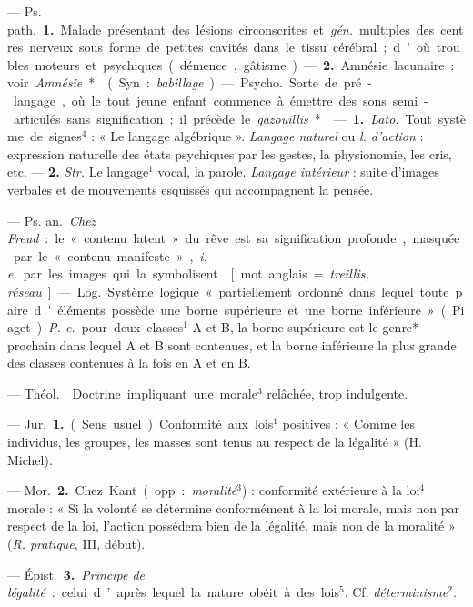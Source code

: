 
	\begin{itemize}[leftmargin=1cm, label=, itemsep=1pt]

 — \si{Ps. path.} {\bf 1.} Malade présentant des lésions
circonscrites et {\it gén.} multiples des centres nerveux sous forme de
petites cavités dans le tissu cérébral ; d’où troubles moteurs et psychiques
(démence, gâtisme). — {\bf 2.} Amnésie lacunaire : voir {\it Amnésie}*.

 (Syn. : {\it babillage}). — \si{Psycho.} Sorte de pré-langage,
où le tout jeune enfant commence à émettre des sons semi-articulés sans
signification ; il précède le {\it gazouillis}*.

 — {\bf 1.} {\it Lato.} Tout système de signes$^4$ : « Le langage
algébrique ». {\it Langage naturel} ou {\it l. d'action} : expression
naturelle des états psychiques par les gestes, la physionomie, les cris, etc.
— {\bf 2.} {\it Str.} Le langage$^1$ vocal, la parole. {\it Langage intérieur} :
suite d'images verbales et de mouvements esquissés qui accompagnent la pensée.

 — \si{Ps. an.} {\it Chez Freud} : le « contenu latent » du rêve
est sa signification profonde, masquée par le « contenu manifeste », {\it i.
e.} par les images qui la symbolisent.

 [mot anglais = {\it treillis, réseau}] — \si{Log.} Système
logique « partiellement ordonné dans lequel toute paire d'éléments possède
une borne supérieure et une borne inférieure » (Piaget). {\it P. e.} pour
deux classes$^1$ A et B, la borne supérieure est le genre* prochain dans
lequel A et B
sont contenues, et la borne inférieure la plus grande des classes contenues à
la fois en A et en B.

 — \si{Théol.}  Doctrine impliquant une morale$^3$
relâchée, trop indulgente.

 — \si{Jur.} {\bf 1.} (Sens usuel). Conformité aux lois$^1$
positives : « Comme les individus, les groupes, les masses sont tenus au
respect de la légalité » (H. Michel).

— \si{Mor.} {\bf 2.} Chez Kant (opp. : {\it moralité}$^3$) : conformité
extérieure à la loi$^4$ morale : « Si la volonté se détermine conformément à
la loi morale, mais non par respect de la loi, l’action possédera bien de la
légalité, mais non de la moralité » ({\it R. pratique}, III, début).

— \si{Épist.} {\bf 3.} {\it Principe de légalité} : celui d’après lequel la nature
obéit à des lois$^5$. Cf. {\it déterminisme}$^2$.


\end{itemize}
